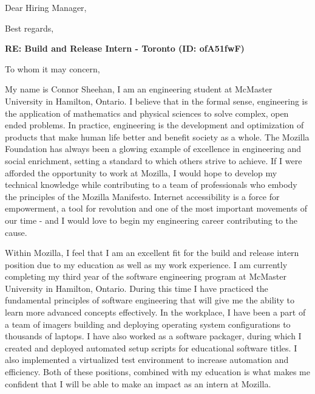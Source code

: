 \documentclass[11pt,a4paper,sans]{moderncv}        %
\begin{document}
\iffalse
\date{January 28\textsuperscript{th}, 2016}
\opening{Dear Hiring Manager,}
\closing{Best regards,}
\makelettertitle

\textbf{RE: Build and Release Intern - Toronto (ID: ofA51fwF)}

To whom it may concern,

My name is Connor Sheehan, I am an engineering student at McMaster University in Hamilton, Ontario. I believe that in the formal sense, engineering is the application of mathematics and physical sciences to solve complex, open ended problems. In practice, engineering is the development and optimization of products that make human life better and benefit society as a whole. The Mozilla Foundation has always been a glowing example of excellence in engineering  and social enrichment, setting a standard to which others strive to achieve. If I were afforded the opportunity to work at Mozilla, I would hope to develop my technical knowledge while contributing to a team of professionals who embody the principles of the Mozilla Manifesto. Internet accessibility is a force for empowerment, a tool for revolution and one of the most important movements of our time - and I would love to begin my engineering career contributing to the cause.

Within Mozilla, I feel that I am an excellent fit for the build and release intern position due to my education as well as my work experience. I am currently completing my third year of the software engineering program at McMaster University in Hamilton, Ontario. During this time I have practiced the fundamental principles of software engineering that will give me the ability to learn more advanced concepts effectively. In the workplace, I have been a part of a team of imagers building and deploying operating system configurations to thousands of laptops. I have also worked as a software packager, during which I created and deployed automated setup scripts for educational software titles. I also implemented a virtualized test environment to increase automation and efficiency. Both of these positions, combined with my education is what makes me confident that I will be able to make an impact as an intern at Mozilla.
\end{document}
